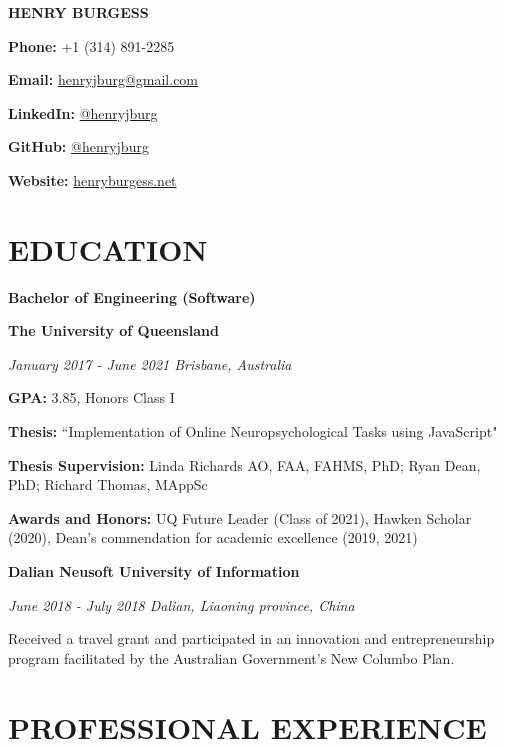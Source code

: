 \documentclass{article}
\begin{document}
  {\Huge\textbf{\uppercase{Henry Burgess}}}\hfill\begin{minipage}{0.26\linewidth}

  \textbf{Phone:} +1 (314) 891-2285

  \textbf{Email:} \href{mailto:henryjburg@gmail.com}{\color{blue}henryjburg@gmail.com}

  \textbf{LinkedIn:} \href{https://www.linkedin.com/in/henryjburg/}{\color{blue}@henryjburg}

  \textbf{GitHub:} \href{https://github.com/henryjburg}{\color{blue}@henryjburg}

  \textbf{Website:} \href{https://henryburgess.net/}{\color{blue}henryburgess.net}

  \end{minipage}

  \section*{\centering\uppercase{Education}}

  {\large\textbf{Bachelor of Engineering (Software)}}

  \textbf{The University of Queensland}

  \textit{January 2017 - June 2021 \hfill Brisbane, Australia}

  \textbf{GPA:} 3.85, Honors Class I

  \textbf{Thesis:} ``Implementation of Online Neuropsychological Tasks using JavaScript"

  \textbf{Thesis Supervision:} Linda Richards AO, FAA, FAHMS, PhD; Ryan Dean, PhD; Richard Thomas, MAppSc

  \textbf{Awards and Honors:} UQ Future Leader (Class of 2021), Hawken Scholar (2020), Dean's commendation for academic excellence (2019, 2021)

  \medbreak

  {\large\textbf{Dalian Neusoft University of Information}}

  \textit{June 2018 - July 2018 \hfill Dalian, Liaoning province, China}

  Received a travel grant and participated in an innovation and entrepreneurship program facilitated by the Australian Government's New Columbo Plan.

  \section*{\centering\uppercase{Professional Experience}}
\end{document}
